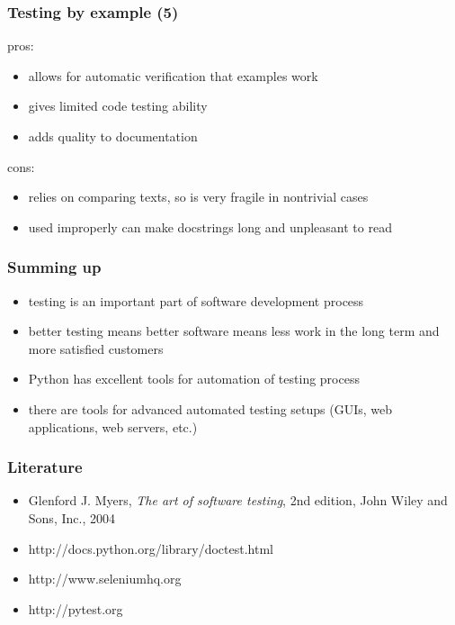 \documentclass{beamer}
\begin{document}
\begin{frame}[fragile]
    \frametitle{Testing by example (5)}

    {\color{green} pros:}
    \begin{itemize}
        \item allows for automatic verification that examples work
        \item gives limited code testing ability
        \item adds quality to documentation
    \end{itemize}
    \pause
    {\color{red} cons:}
    \begin{itemize}
        \item relies on comparing texts, so is very fragile in nontrivial cases
        \item used improperly can make docstrings long and unpleasant to read
    \end{itemize}
\end{frame}

\begin{frame}[fragile]
    \frametitle{Summing up}

    \begin{itemize}
        \item testing is an important part of software development process
        \pause
        \item better testing means better software means less work in the
        long term and more satisfied customers
        \pause
        \item Python has excellent tools for automation of testing process
        \pause
        \item there are tools for advanced automated testing setups (GUIs,
        web applications, web servers, etc.)
    \end{itemize}
\end{frame}

\begin{frame}[fragile]
    \frametitle{Literature}

    \begin{itemize}
        \item Glenford J. Myers, \emph{The art of software testing}, 2nd edition, John Wiley and Sons, Inc., 2004
        \item http://docs.python.org/library/doctest.html
        \item http://www.seleniumhq.org
        \item http://pytest.org
    \end{itemize}
\end{frame}
\end{document}
